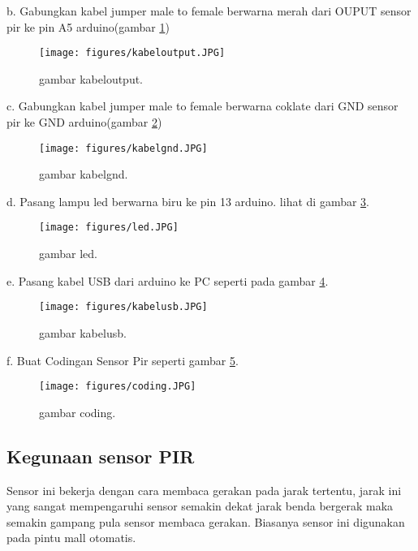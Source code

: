 b. Gabungkan kabel jumper male to female berwarna merah dari OUPUT sensor pir ke pin A5 arduino(gambar \ref{ckkabeloutput})

\begin{figure} [ht]
\centerline{\texttt{[image: figures/kabeloutput.JPG]}}
\caption{gambar kabeloutput.}
\label{ckkabeloutput}
\end{figure}

c. Gabungkan kabel jumper male to female berwarna coklate dari GND sensor pir ke GND arduino(gambar \ref{ckkabelgnd})

\begin{figure} [ht]
\centerline{\texttt{[image: figures/kabelgnd.JPG]}}
\caption{gambar kabelgnd.}
\label{ckkabelgnd}
\end{figure}

d. Pasang lampu led berwarna biru ke pin 13 arduino. lihat di gambar \ref{ckled}.

\begin{figure} [ht]
\centerline{\texttt{[image: figures/led.JPG]}}
\caption{gambar led.}
\label{ckled}
\end{figure}

e. Pasang kabel USB dari arduino ke PC seperti pada gambar \ref{ckkabelusb}.

\begin{figure} [ht]
\centerline{\texttt{[image: figures/kabelusb.JPG]}}
\caption{gambar kabelusb.}
\label{ckkabelusb}
\end{figure}

f. Buat Codingan Sensor Pir seperti gambar \ref{coding}.

\begin{figure} [ht]
\centerline{\texttt{[image: figures/coding.JPG]}}
\caption{gambar coding.}
\label{coding}
\end{figure}

\subsection {Kegunaan sensor PIR}
Sensor ini bekerja dengan cara membaca gerakan pada jarak tertentu, jarak ini yang sangat mempengaruhi sensor semakin dekat jarak benda bergerak maka semakin gampang pula sensor membaca gerakan.
Biasanya sensor ini digunakan pada pintu mall otomatis.

